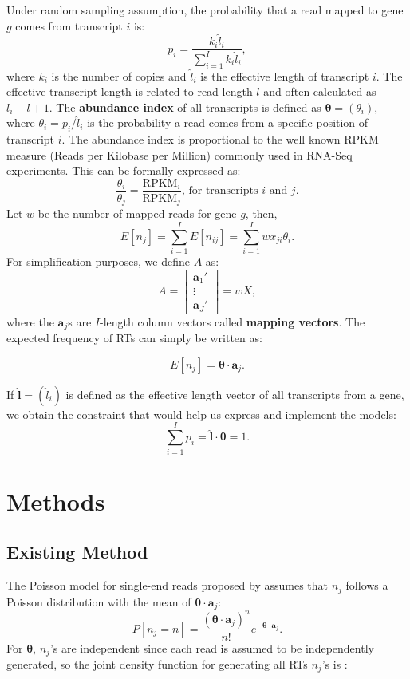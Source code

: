 \documentclass[11pt]{article}
\begin{document}
\noindent Under random sampling assumption, the probability that a read mapped to gene $g$ comes from transcript $i$ is:
\[p_i=\frac{k_i\widehat{l}_i}{\sum_{i=1}^{I}{k_i\widehat{l}_i}},\] 
\noindent where $k_i$ is the number of copies and $\widehat{l}_i$ is the effective length of transcript $i$. The effective transcript length is related to read length $l$ and often calculated as $l_i-l+1$. The \textbf{abundance index} of all transcripts is defined as $\boldsymbol{\theta}=(\theta_i)$, where $\theta_i=p_i/\widehat{l}_i$ is the probability a read comes from a specific position of transcript $i$. The abundance index is proportional to the well known RPKM measure (Reads per Kilobase per Million) commonly used in RNA-Seq experiments. This can be formally expressed as: 
\[\frac{\theta_i}{\theta_j}=\frac{\text{RPKM}_i}{\text{RPKM}_j}\text{, for transcripts } i\text{ and } j.\] 
Let $w$ be the number of mapped reads for gene $g$, then,
\[E[n_j]=\sum_{i=1}^IE[n_{ij}]=\sum_{i=1}^Iwx_{ji}\theta_i.\]
For simplification purposes, we define $A$ as:
 \[A=\begin{bmatrix}\mathbf{a}_1'\\ \vdots \\ \mathbf{a}_J'\end{bmatrix}=wX,\] where the $\mathbf{a}_j$s are $I$-length column vectors called \textbf{mapping vectors}. The expected frequency of RTs can simply be written as:  

\begin{equation}
E[n_j]=\boldsymbol{\theta}\cdot\mathbf{a}_j.
\end{equation}

\noindent If $\widehat{\mathbf{l}}=(\widehat{l}_i)$ is defined as the effective length vector of all transcripts from a gene, we obtain the constraint that would help us express and implement the models:
\begin{equation}
\label{constr} 
\sum_{i=1}^{I}{p_i}=\mathbf{\widehat{l}}\cdot\boldsymbol{\theta}=1.
\end{equation}

\section{Methods}
\label{methods}

\subsection{Existing Method}

The Poisson model for single-end reads proposed by\cite{salzman2011statistical} assumes that $n_j$ follows a Poisson distribution with the mean of $\boldsymbol{\theta}\cdot \mathbf{a}_j$:
\[P[n_j=n]=\frac{(\boldsymbol{\theta}\cdot\mathbf{a}_j)^n}{n!}e^{-\boldsymbol{\theta}\cdot\mathbf{a}_j}.\]
For $\boldsymbol{\theta}$, $n_j$’s are independent since each read is assumed to be independently generated, so the joint density function for generating all RTs $n_j$’s is :
\end{document}

